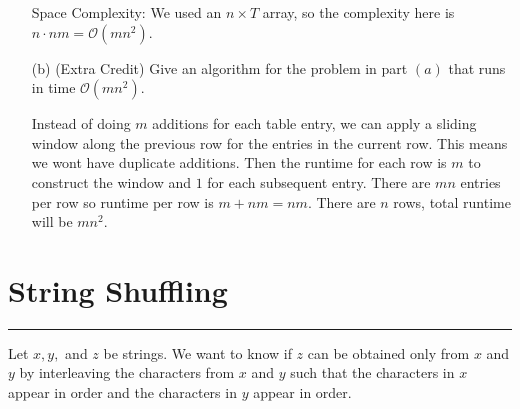 \documentclass{article}
\begin{document}
\begin{itemize}
\begin{answer}
                Space Complexity: We used an $n \times T$ array, so the complexity here is $n \cdot nm = \mathcal{O}(mn^{2})$.

            \end{answer}

        \item [(b)] (Extra Credit) Give an algorithm for the problem in part $(a)$ that runs in time $\mathcal{O}(mn^{2})$.
            \begin{answer}
                Instead of doing $m$ additions for each table entry, we can apply a sliding window along the previous row for the entries in the current row. This means we wont have duplicate additions. Then the runtime for each row is $m$ to construct the window and $1$ for each subsequent entry. There are $mn$ entries per row so runtime per row is $m + nm = nm$. There are $n$ rows, total runtime will be $mn^{2}$.
            \end{answer}
    \end{itemize}

\newpage
\section*{String Shuffling}
\hrule

Let $x, y, $ and $z$ be strings. We want to know if $z$ can be obtained only from $x$ and $y$ by interleaving the characters from $x$ and $y$ such that the characters in $x$ appear in order and the characters in $y$ appear in order.
\end{document}
